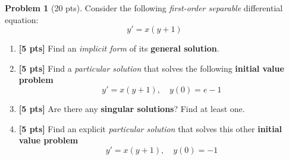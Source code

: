 \documentclass[12pt]{article}
\theoremstyle{definition}
\newtheorem{problem}{Problem}
\begin{document}
  \begin{problem}[20 pts]
  Consider the following \emph{first-order separable} differential equation:
  \begin{equation*}
  y' = x(y+1)
  \end{equation*}
  \begin{enumerate}
    \item \textbf{[5 pts]} Find an \emph{implicit form} of its \textbf{general solution}.
    \vspace{4.25cm}
    \begin{flushright}
    \end{flushright}  
    \item \textbf{[5 pts]} Find a \emph{particular solution} that solves the following \textbf{initial value problem}
    \begin{equation*}
    y' = x(y+1), \quad y(0) = e-1
    \end{equation*}
    \begin{flushright}
    \end{flushright}
    \item \textbf{[5 pts]} Are there any \textbf{singular solutions}?  Find at least one.
    \begin{flushright}
    \end{flushright}
    \item \textbf{[5 pts]} Find an explicit \emph{particular solution} that solves this other \textbf{initial value problem}
    \begin{equation*}
    y' = x(y+1), \quad y(0) = -1
    \end{equation*}
    \begin{flushright}
    \end{flushright}
  \end{enumerate}
  \end{problem}
  \newpage
\end{document}
